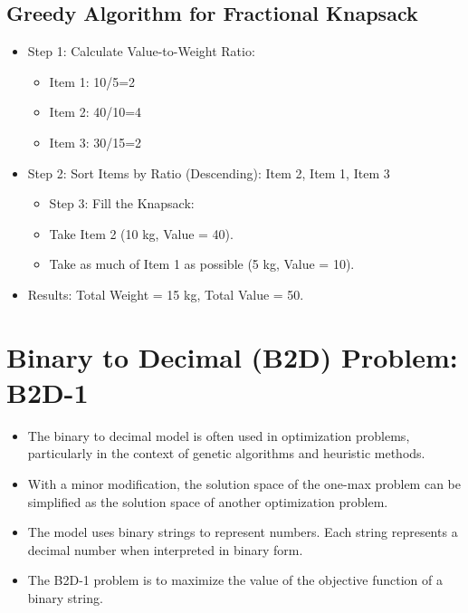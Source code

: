 \documentclass[
  letterpaper,
  DIV=11,
  numbers=noendperiod]{scrreprt}
\providecommand{\tightlist}{%
  \setlength{\itemsep}{0pt}\setlength{\parskip}{0pt}}\usepackage{longtable,booktabs,array}
\begin{document}
\subsection{Greedy Algorithm for Fractional
Knapsack}\label{greedy-algorithm-for-fractional-knapsack}

\begin{itemize}
\tightlist
\item
  Step 1: Calculate Value-to-Weight Ratio:

  \begin{itemize}
  \tightlist
  \item
    Item 1: 10/5=2
  \item
    Item 2: 40/10=4
  \item
    Item 3: 30/15=2
  \end{itemize}
\item
  Step 2: Sort Items by Ratio (Descending): Item 2, Item 1, Item 3

  \begin{itemize}
  \tightlist
  \item
    Step 3: Fill the Knapsack:
  \item
    Take Item 2 (10 kg, Value = 40).
  \item
    Take as much of Item 1 as possible (5 kg, Value = 10).
  \end{itemize}
\item
  Results: Total Weight = 15 kg, Total Value = 50.
\end{itemize}

\section{Binary to Decimal (B2D) Problem:
B2D-1}\label{binary-to-decimal-b2d-problem-b2d-1}

\begin{itemize}
\tightlist
\item
  The binary to decimal model is often used in optimization problems,
  particularly in the context of genetic algorithms and heuristic
  methods.
\item
  With a minor modification, the solution space of the one-max problem
  can be simplified as the solution space of another optimization
  problem.
\item
  The model uses binary strings to represent numbers. Each string
  represents a decimal number when interpreted in binary form.
\item
  The B2D-1 problem is to maximize the value of the objective function
  of a binary string.
\end{itemize}
\end{document}
